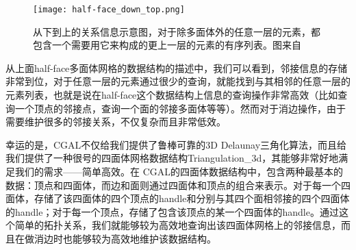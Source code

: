 \begin{figure}[htbp]
    \centering
    \texttt{[image: half-face\_down\_top.png]}
    \caption[half-face从下到上的关系]{从下到上的关系信息示意图，对于除多面体外的任意一层的元素，都包含一个需要用它来构成的更上一层的元素的有序列表。图来自\cite{open-volume-mesh}}
    \label{fig:half-face-down-top}
\end{figure}
从上面half-face多面体网格的数据结构的描述中，我们可以看到，邻接信息的存储非常到位，对于任意一层的元素通过很少的查询，就能找到与其相邻的任意一层的元素列表，也就是说在half-face这个数据结构上信息的查询操作非常高效（比如查询一个顶点的邻接点，查询一个面的邻接多面体等等）。然而对于消边操作，由于需要维护很多的邻接关系，不仅复杂而且非常低效。\par
幸运的是，CGAL不仅给我们提供了鲁棒可靠的3D Delaunay三角化算法，而且给我们提供了一种很号的四面体网格数据结构Triangulation\_3d，其能够非常好地满足我们的需求——简单高效。在 CGAL的四面体数据结构中，包含两种最基本的数据：顶点和四面体，而边和面则通过四面体和顶点的组合来表示。对于每一个四面体，存储了该四面体的四个顶点的handle和分别与其四个面相邻接的四个四面体的handle；对于每一个顶点，存储了包含该顶点的某一个四面体的handle。通过这个简单的拓扑关系，我们就能够较为高效地查询出该四面体网格上的邻接信息，而且在做消边时也能够较为高效地维护该数据结构。

